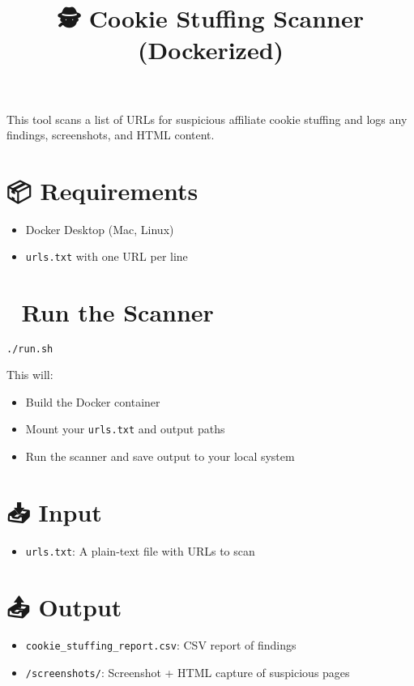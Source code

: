 \documentclass[12pt]{article}
\title{\textbf{🕵️ Cookie Stuffing Scanner (Dockerized)}}
\author{}
\date{}
\begin{document}
\maketitle

\noindent
This tool scans a list of URLs for suspicious affiliate cookie stuffing and logs any findings, screenshots, and HTML content.

\section*{📦 Requirements}
\begin{itemize}
    \item Docker Desktop (Mac, Linux)
    \item \texttt{urls.txt} with one URL per line
\end{itemize}

\section*{🚀 Run the Scanner}
\begin{lstlisting}[language=bash]
./run.sh
\end{lstlisting}

\noindent
This will:
\begin{itemize}
    \item Build the Docker container
    \item Mount your \texttt{urls.txt} and output paths
    \item Run the scanner and save output to your local system
\end{itemize}

\section*{📥 Input}
\begin{itemize}
    \item \texttt{urls.txt}: A plain-text file with URLs to scan
\end{itemize}

\section*{📤 Output}
\begin{itemize}
    \item \texttt{cookie_stuffing_report.csv}: CSV report of findings
    \item \texttt{/screenshots/}: Screenshot + HTML capture of suspicious pages
\end{itemize}
\end{document}
